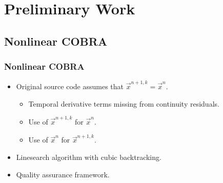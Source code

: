 \documentclass[compress,xcolor=table]{beamer}
\begin{document}
\section[Preliminary Work]{Preliminary Work}
\subsection[COBRA]{Nonlinear COBRA}
\begin{frame}
\frametitle{Nonlinear COBRA}

\begin{itemize}
\item{Original source code assumes that $\vec{x}^{n+1,k} = \vec{x}^{n}$.
    \begin{itemize}
    \item{Temporal derivative terms missing from continuity residuals.}
    \item{Use of $\vec{x}^{n+1,k}$ for $\vec{x}^{n}$.}
    \item{Use of $\vec{x}^{n}$ for $\vec{x}^{n+1,k}$.}
    \end{itemize}
}
\item{Linesearch algorithm with cubic backtracking.}
\item{Quality assurance framework.}
\end{itemize}

\end{frame}
\end{document}
